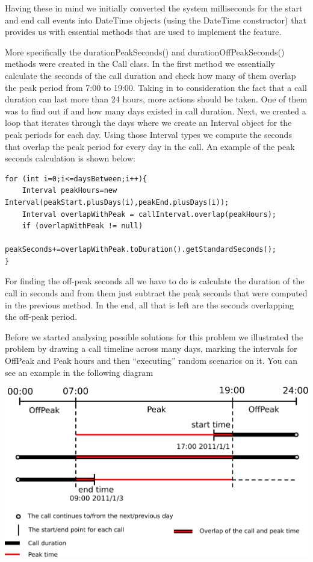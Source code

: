 \documentclass[pdftex,11pt,a4paper]{article}
\begin{document}
Having these in mind we initially converted the system milliseconds for the start and end call events into DateTime objects (using the DateTime constructor) that provides us with essential methods that are used to implement the feature.

More specifically the durationPeakSeconds() and  durationOffPeakSeconds() methods were created in the Call class. In the first method we essentially calculate the seconds of the call duration and check how many of them overlap the peak period from 7:00 to 19:00. Taking in to consideration the fact that a call duration can last more than 24 hours, more actions should be taken. One of them was to find out if and how many days existed in call duration. Next, we created a loop that iterates through the days where we create an Interval object for the peak periods for each day. Using those Interval types we compute the seconds that overlap the peak period for every day in the call. An example of the peak seconds calculation is shown below:

\begin{lstlisting}
for (int i=0;i<=daysBetween;i++){
	Interval peakHours=new Interval(peakStart.plusDays(i),peakEnd.plusDays(i));
	Interval overlapWithPeak = callInterval.overlap(peakHours);
	if (overlapWithPeak != null)
		peakSeconds+=overlapWithPeak.toDuration().getStandardSeconds();
}
\end{lstlisting}

For finding the off-peak seconds all we have to do is calculate the duration of the call in seconds and from them just subtract the peak seconds that were computed in the previous method. In the end, all that is left are the seconds overlapping the off-peak period.

Before we started analysing possible solutions for this problem we illustrated the problem by drawing a call timeline across many days, marking the intervals for OffPeak and Peak hours and then “executing” random scenarios on it. You can see an example in the following diagram

\begin{center}
	\includegraphics[scale=0.75]{images/timeline.pdf}
\end{center}
\end{document}
